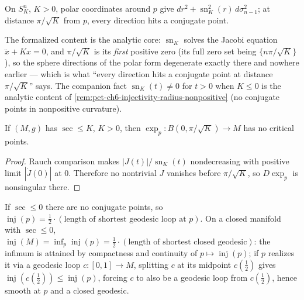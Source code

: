 \begin{example}
  \label{ex:pet-ch6-conjugate-point-space-form}
  \leanok
  On $S^n_K$, $K>0$, polar coordinates around $p$ give
  $dr^2+\operatorname{sn}_K^2(r)\,d\sigma_{n-1}^2$; at distance $\pi/\sqrt K$ from $p$,
  every direction hits a conjugate point.

  The formalized content is the analytic core: $\operatorname{sn}_K$ solves the
  Jacobi equation $\ddot x+Kx=0$, and $\pi/\sqrt K$ is its \emph{first} positive
  zero (its full zero set being $\{n\pi/\sqrt K\}$), so the sphere directions of
  the polar form degenerate exactly there and nowhere earlier — which is what
  ``every direction hits a conjugate point at distance $\pi/\sqrt K$'' says. The
  companion fact $\operatorname{sn}_K(t)\ne0$ for $t>0$ when $K\le0$ is the
  analytic content of \cref{rem:pet-ch6-injectivity-radius-nonpositive}
  (no conjugate points in nonpositive curvature).
\end{example}

\begin{theorem}
  \label{thm:pet-ch6-conjugate-radius-bound}
  If $(M,g)$ has $\sec\le K$, $K>0$, then
  $\exp_p:B(0,\pi/\sqrt K)\to M$ has no critical points.
\end{theorem}
\begin{proof}
  \sketch
  Rauch comparison makes \(|J(t)|/\operatorname{sn}_K(t)\) nondecreasing with positive limit \(|\dot J(0)|\) at \(0\). Therefore no nontrivial \(J\) vanishes before \(\pi/\sqrt K\), so \(D\exp_p\) is nonsingular there.
\end{proof}

\begin{remark}
  \label{rem:pet-ch6-injectivity-radius-nonpositive}
  If $\sec\le0$ there are no conjugate points, so
  $\operatorname{inj}(p)=\tfrac12\cdot(\text{length of shortest geodesic loop at }p)$.
  On a closed manifold with $\sec\le0$,
  $\operatorname{inj}(M)=\inf_p\operatorname{inj}(p)=\tfrac12\cdot(\text{length of shortest closed
  geodesic})$: the infimum is attained by compactness and continuity of
  $p\mapsto\operatorname{inj}(p)$; if $p$ realizes it via a geodesic loop $c:[0,1]\to M$,
  splitting $c$ at its midpoint $c(\tfrac12)$ gives
  $\operatorname{inj}(c(\tfrac12))\le\operatorname{inj}(p)$, forcing $c$ to also be a geodesic loop
  from $c(\tfrac12)$, hence smooth at $p$ and a closed geodesic.
\end{remark}

